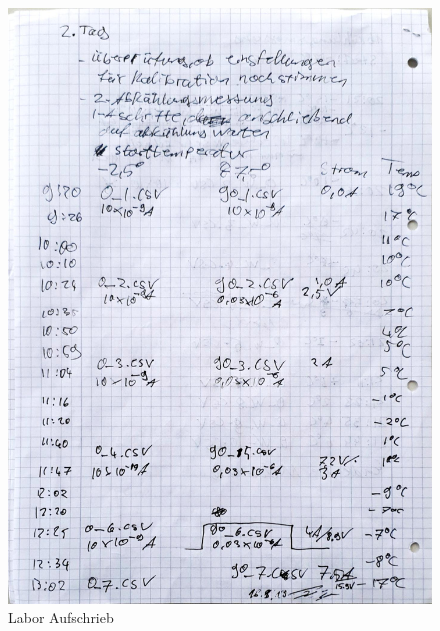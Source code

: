 \begin{figure}
	\includegraphics[scale=0.35]{Bild/Lab4}
	\centering
	\caption{Labor Aufschrieb}
\end{figure}